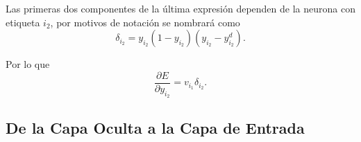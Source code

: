 \documentclass[11pt,letterpaper]{article}
\theoremstyle{definition}
\theoremstyle{definition}
\theoremstyle{definition}
\theoremstyle{definition}
\theoremstyle{definition}
\theoremstyle{definition}
\theoremstyle{definition}
\theoremstyle{definition}
\begin{document}
Las primeras dos componentes de la última expresión dependen de la neurona con etiqueta $ i_2 $, por motivos de notación se nombrará como
\begin{equation}\label{deltao}
	\delta_{i_2}= y_{i_2}(1-y_{i_2})(y_{i_2}-y_{i_2}^d).
\end{equation}

Por lo que
\[ \dfrac{\partial E}{\partial y_{i_2}}= v_{i_1}\delta_{i_2}. \]

\subsection{De la Capa Oculta a la Capa de Entrada}
\end{document}
